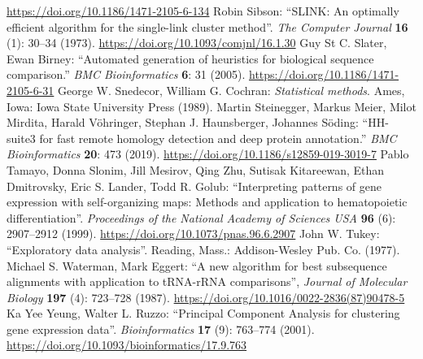 \documentclass{report}
\begin{document}
\begin{thebibliography}{99}
\url{https://doi.org/10.1186/1471-2105-6-134}
Robin Sibson: ``SLINK: An optimally efficient algorithm for the single-link cluster method''. \textit{The Computer Journal} {\bf 16} (1): 30--34 (1973).
\url{https://doi.org/10.1093/comjnl/16.1.30}
Guy St C. Slater, Ewan Birney: ``Automated generation of heuristics for biological sequence comparison.'' \textit{BMC Bioinformatics} {\bf 6}: 31 (2005).
\url{https://doi.org/10.1186/1471-2105-6-31}
George W. Snedecor, William G. Cochran: \textit{Statistical methods}. Ames, Iowa: Iowa State University Press (1989).
Martin Steinegger, Markus Meier, Milot Mirdita, Harald V\"ohringer, Stephan J. Haunsberger, Johannes S\"oding: ``HH-suite3 for fast remote homology detection and deep protein annotation.'' \textit{BMC Bioinformatics} {\bf 20}: 473 (2019).
\url{https://doi.org/10.1186/s12859-019-3019-7}
Pablo Tamayo, Donna Slonim, Jill Mesirov, Qing Zhu, Sutisak Kitareewan, Ethan Dmitrovsky, Eric S. Lander, Todd R. Golub: ``Interpreting patterns of gene expression with self-organizing maps: Methods and application to hematopoietic differentiation''. \textit{Proceedings of the National Academy of Sciences USA} {\bf 96} (6): 2907--2912 (1999).
\url{https://doi.org/10.1073/pnas.96.6.2907}
John W. Tukey: ``Exploratory data analysis''. Reading, Mass.: Addison-Wesley Pub. Co. (1977).
Michael S. Waterman, Mark Eggert: ``A new algorithm for best subsequence alignments with application to tRNA-rRNA comparisons'', \textit{Journal of Molecular Biology} {\bf 197} (4): 723--728 (1987). \url{https://doi.org/10.1016/0022-2836(87)90478-5}
Ka Yee Yeung, Walter L. Ruzzo: ``Principal Component Analysis for clustering gene expression data''. \textit{Bioinformatics} {\bf 17} (9): 763--774 (2001).
\url{https://doi.org/10.1093/bioinformatics/17.9.763}
\end{thebibliography}
\end{document}
